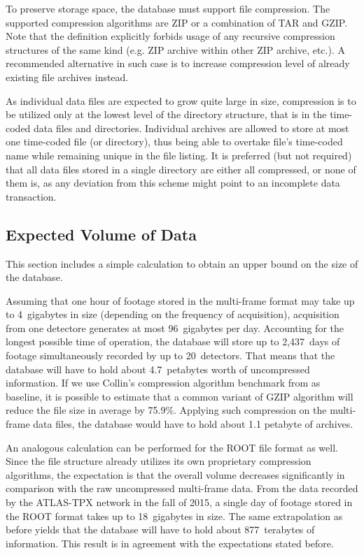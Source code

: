 
To preserve storage space, the database must support file compression. The supported compression algorithms are ZIP or a combination of TAR and GZIP. Note that the definition explicitly forbids usage of any recursive compression structures of the same kind (e.g. ZIP archive within other ZIP archive, etc.). A recommended alternative in such case is to increase compression level of already existing file archives instead.

As individual data files are expected to grow quite large in size, compression is to be utilized only at the lowest level of the directory structure, that is in the time-coded data files and directories. Individual archives are allowed to store at most one time-coded file (or directory), thus being able to overtake file's time-coded name while remaining unique in the file listing. It is preferred (but not required) that all data files stored in a single directory are either all compressed, or none of them is, as any deviation from this scheme might point to an incomplete data transaction.

\todo %

\subsection{Expected Volume of Data}
This section includes a simple calculation to obtain an upper bound on the size of the database.

Assuming that one hour of footage stored in the multi-frame format may take up to 4~gigabytes in size (depending on the frequency of acquisition), acquisition from one detectore generates at most 96~gigabytes per day. Accounting for the longest possible time of operation, the database will store up to 2,437~days of footage simultaneously recorded by up to 20~detectors. That means that the database will have to hold about 4.7~petabytes worth of uncompressed information. If we use Collin's compression algorithm benchmark from \cite{GzipBenchmark} as baseline, it is possible to estimate that a common variant of GZIP algorithm will reduce the file size in average by 75.9\%. Applying such compression on the multi-frame data files, the database would have to hold about 1.1 petabyte of archives.

An analogous calculation can be performed for the ROOT file format as well. Since the file structure already utilizes its own proprietary compression algorithms, the expectation is that the overall volume decreases significantly in comparison with the raw uncompressed multi-frame data. From the data recorded by the ATLAS-TPX network in the fall of 2015, a single day of footage stored in the ROOT format takes up to 18~gigabytes in size. The same extrapolation as before yields that the database will have to hold about 877~terabytes of information. This result is in agreement with the expectations stated before.

